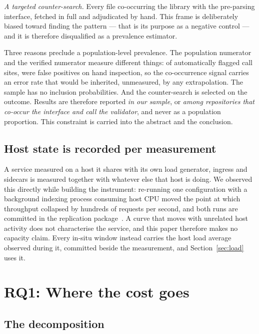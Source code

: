 \documentclass[pdflatex,sn-basic,twocolumn]{sn-jnl}%
\begin{document}
\emph{A targeted counter-search.} Every file co-occurring the library with the
pre-parsing interface, fetched in full and adjudicated by hand. This frame is
deliberately biased toward finding the pattern --- that is its purpose as a
negative control --- and it is therefore disqualified as a prevalence estimator.

Three reasons preclude a population-level prevalence. The population numerator
and the verified numerator measure different things: of \AdjudicatedTotal{}
automatically flagged call sites, \AdjudicatedFalsePositive{} were false
positives on hand inspection, so the co-occurrence signal carries an error rate
that would be inherited, unmeasured, by any extrapolation. The sample has no
inclusion probabilities. And the counter-search is selected on the outcome.
Results are therefore reported \emph{in our sample}, or \emph{among repositories
that co-occur the interface and call the validator}, and never as a population
proportion. This constraint is carried into the abstract and the conclusion.

\subsection{Host state is recorded per measurement}\label{sec:hoststate}

A service measured on a host it shares with its own load generator, ingress and
sidecars is measured together with whatever else that host is doing. We observed
this directly while building the instrument: re-running one configuration with a
background indexing process consuming host CPU moved the point at which
throughput collapsed by hundreds of requests per second, and both runs are
committed in the replication package~\citep{artifact2026}. A curve that moves
with unrelated host activity does not characterise the service, and this paper
therefore makes no capacity claim. Every in-situ window instead carries the host
load average observed during it, committed beside the measurement, and
Section~\ref{sec:load} uses it.

\section{RQ1: Where the cost goes}\label{sec:rq1}

\subsection{The decomposition}
\end{document}
